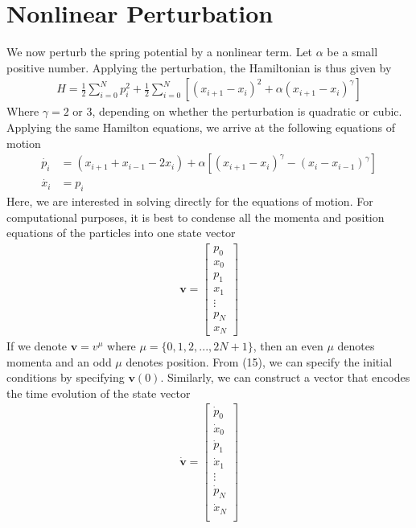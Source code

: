 \documentclass{article}
\newcommand{\ve}{\mathbf}
\begin{document}
\section{Nonlinear Perturbation}
We now perturb the spring potential by a nonlinear term. Let $\alpha$ be a small 
positive number. Applying the perturbation, the Hamiltonian is thus given by 
\begin{align}
    H=\frac{1}{2}\sum_{i=0}^Np_i^2+\frac{1}{2}\sum_{i=0}^N[  (x_{i+1}-x_i)^2 + \alpha (x_{i+1}-x_i)^\gamma ]
\end{align}
Where $\gamma=2$ or 3, depending on whether the perturbation is quadratic or cubic. Applying the same Hamilton equations, we arrive at the following equations of motion 
\begin{align}
    \dot{p_i}&=(x_{i+1}+x_{i-1}-2x_i)+\alpha [(x_{i+1}-x_i)^\gamma-(x_i-x_{i-1})^\gamma]\\
    \dot{x_i}&=p_i
\end{align}
Here, we are interested in solving directly for the equations of motion. For computational purposes, 
it is best to condense all the momenta and position equations of the particles
into one state vector
\begin{align}
    \ve{v}=\begin{bmatrix}
        p_0\\ 
    x_0\\ 
    p_1\\ 
    x_1\\ 
    \vdots\\ 
    p_N\\ 
    x_N
    \end{bmatrix}
\end{align}
If we denote $\ve{v}=v^\mu$ where $\mu=\{ 0, 1, 2, ..., 2N+1\}$, 
then an even $\mu$ denotes momenta  and an odd $\mu$ denotes position.
From (15), we can specify the initial conditions by specifying $\ve{v}(0)$.
Similarly, we can construct a vector 
that encodes the time evolution of the state vector 
\begin{align}
    \dot{\ve{v}}=\begin{bmatrix}
    \dot{p}_0\\ 
    \dot{x}_0\\ 
    \dot{p}_1\\ 
    \dot{x}_1\\ 
    \vdots\\ 
    \dot{p}_N\\ 
    \dot{x}_N\\ 
    \end{bmatrix}
\end{align}
\end{document}
